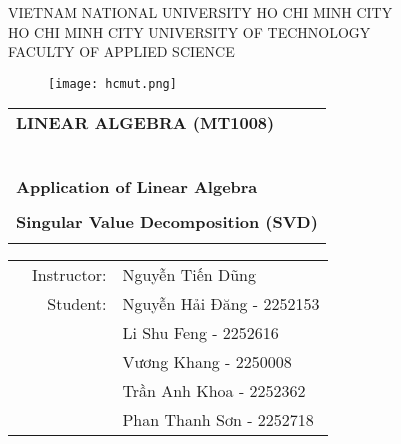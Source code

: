\documentclass[a4paper]{article}
\begin{document}
	\justify
	{\fontsize{10}{10}\selectfont
		\begin{titlepage}
			\begin{center}
				VIETNAM NATIONAL UNIVERSITY HO CHI MINH CITY \\
				HO CHI MINH CITY UNIVERSITY OF TECHNOLOGY \\
				FACULTY OF APPLIED SCIENCE 
			\end{center}
			
			\vspace{1cm}
			
			\begin{figure}[h!]
				\begin{center}
					\texttt{[image: hcmut.png]}
				\end{center}
			\end{figure}
			
			\vspace{1cm}
			
			
			\begin{center}
				\begin{tabular}{c}
					\multicolumn{1}{l}{\textbf{{\Large LINEAR ALGEBRA (MT1008)}}}\\
					~~\\
					\hline
					\\
					\multicolumn{1}{l}{\textbf{{\Large Application of Linear Algebra }}}\\
					\\
					
					\textbf{{\Huge Singular Value Decomposition (SVD) }}\\
					\\
					\hline
				\end{tabular}
			\end{center}
			
			\vspace{3cm}
			
			\begin{table}[h]
				\begin{tabular}{rrl}
					\hspace{5 cm} & Instructor: &Nguyễn Tiến Dũng\\
					& Student: & Nguyễn Hải Đăng - 2252153\\
					& & Li Shu Feng - 2252616 \\
					& & Vương Khang - 2250008\\
					& & Trần Anh Khoa - 2252362 \\
					& & Phan Thanh Sơn - 2252718\\
				\end{tabular}
			\end{table}
			

\end{titlepage}}
\end{document}
